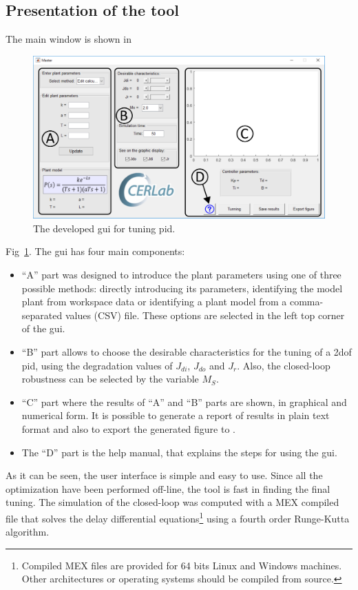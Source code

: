 \subsection{Presentation of the tool}
The main window is shown in %
%
\begin{figure}%
	\centering
	\includegraphics[width=\textwidth]{figuras/gui}
	\caption{The developed \gls{gui} for tuning \gls{pid}.}
	\label{f:gui_tuner}
\end{figure}
%
Fig~\ref{f:gui_tuner}. The \gls{gui} has four main components:
%
\begin{itemize}
	\item ``A'' part was designed to introduce the plant parameters using one of three possible methods: directly introducing its parameters, identifying the model plant from workspace data or identifying a plant model from a comma-separated values (CSV) file. These options are selected in the left top corner of the \gls{gui}.
	\item ``B'' part allows to choose the desirable characteristics for the tuning of a \gls{2dof} \gls{pid}, using the degradation values of $J_{di}$, $J_{do}$ and $J_r$. Also, the closed-loop robustness can be selected by the variable $M_S$.
	\item ``C'' part where the results of ``A'' and ``B'' parts are shown, in graphical and numerical form. It is possible to generate a report of results in plain text format and also to export the generated figure to \matlab.
	\item The ``D'' part is the help manual, that explains the steps for using the \gls{gui}.
\end{itemize}
%

As it can be seen, the user interface is simple and easy to use. Since all the optimization have been performed off-line, the tool is fast in finding the final tuning. The simulation of the closed-loop was computed with a MEX compiled file that solves the delay differential equations\footnote{Compiled MEX files are provided for 64 bits Linux and Windows machines. Other architectures or operating systems should be compiled from source.} using a fourth order Runge-Kutta algorithm.


